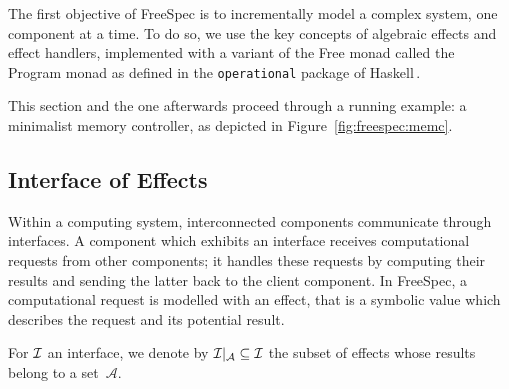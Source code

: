 The first objective of FreeSpec is to incrementally model a complex system, one
component at a time.
%
To do so, we use the key concepts of algebraic effects and effect handlers,
implemented with a variant of the Free monad called the Program monad as defined
in the \texttt{operational} package of Haskell\,\cite{operational}.

This section and the one afterwards proceed through a running example: a
minimalist memory controller, as depicted in Figure~\ref{fig:freespec:memc}.

%

\subsection{Interface of Effects}

Within a computing system, interconnected components communicate through
interfaces.
%
A component which exhibits an interface receives computational requests from
other components; it handles these requests by computing their results and
sending the latter back to the client component.
%
In FreeSpec, a computational request is modelled with an effect, that is a
symbolic value which describes the request and its potential result.

For $\mathcal{I}$ an interface, we denote by $\mathcal{I}|_{\mathcal{A}} \subseteq \mathcal{I}$
the subset of effects whose results belong to a set~$\mathcal{A}$.

